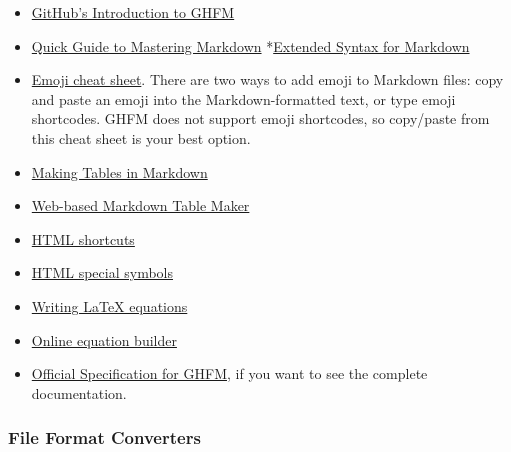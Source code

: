 \documentclass[
]{article}
\providecommand{\tightlist}{%
  \setlength{\itemsep}{0pt}\setlength{\parskip}{0pt}}
\begin{document}
\begin{itemize}
\tightlist
\item
  \href{https://docs.github.com/en/github/writing-on-github/getting-started-with-writing-and-formatting-on-github/basic-writing-and-formatting-syntax}{GitHub's
  Introduction to GHFM}
\item
  \href{https://guides.github.com/features/mastering-markdown/}{Quick
  Guide to Mastering Markdown}
  *\href{https://www.markdownguide.org/extended-syntax/}{Extended Syntax
  for Markdown}
\item
  \href{https://github.com/ikatyang/emoji-cheat-sheet/blob/master/README.md}{Emoji
  cheat sheet}. There are two ways to add emoji to Markdown files: copy
  and paste an emoji into the Markdown-formatted text, or type emoji
  shortcodes. GHFM does not support emoji shortcodes, so copy/paste from
  this cheat sheet is your best option.
\item
  \href{https://www.pluralsight.com/guides/working-tables-github-markdown}{Making
  Tables in Markdown}
\item
  \href{https://www.tablesgenerator.com/markdown_tables}{Web-based
  Markdown Table Maker}
\item
  \href{https://www.w3schools.com/html/html_formatting.asp}{HTML
  shortcuts}
\item
  \href{https://www.w3schools.com/html/html_symbols.asp}{HTML special
  symbols}
\item
  \href{https://www.overleaf.com/learn/latex/Mathematical_expressions}{Writing
  LaTeX equations}
\item
  \href{https://latex.codecogs.com/legacy/eqneditor/editor.php}{Online
  equation builder}
\item
  \href{https://github.github.com/gfm/}{Official Specification for
  GHFM}, if you want to see the complete documentation.
\end{itemize}

\hypertarget{file-format-converters}{%
\subsubsection{File Format Converters}\label{file-format-converters}}
\end{document}

